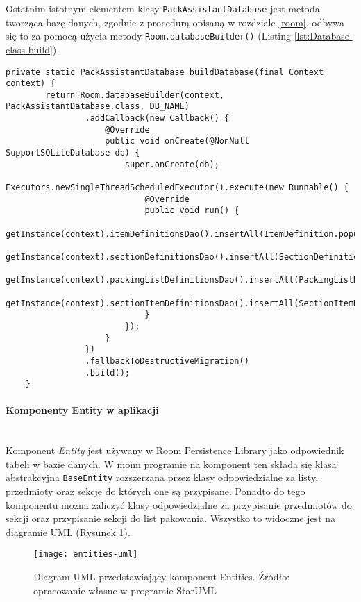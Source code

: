 \documentclass[a4paper,12pt]{article}
\newcommand{\imagewidth}{1.0}
\begin{document}
Ostatnim istotnym elementem klasy \texttt{PackAssistantDatabase} jest metoda tworząca bazę danych, zgodnie z procedurą opisaną w rozdziale \ref{room}, odbywa się to za pomocą użycia metody \texttt{Room.databaseBuilder()} (Listing \ref{lst:Database-class-build}).
\begin{lstlisting}[caption= Metoda \textit{buildDatabase} w klasie PackAssistantDatabase,label={lst:Database-class-build}]
private static PackAssistantDatabase buildDatabase(final Context context) {
        return Room.databaseBuilder(context, PackAssistantDatabase.class, DB_NAME)
                .addCallback(new Callback() {
                    @Override
                    public void onCreate(@NonNull SupportSQLiteDatabase db) {
                        super.onCreate(db);
                        Executors.newSingleThreadScheduledExecutor().execute(new Runnable() {
                            @Override
                            public void run() {
                                getInstance(context).itemDefinitionsDao().insertAll(ItemDefinition.populateData());
                                getInstance(context).sectionDefinitionsDao().insertAll(SectionDefinition.populateData());
                                getInstance(context).packingListDefinitionsDao().insertAll(PackingListDefinition.populateData());
                                getInstance(context).sectionItemDefinitionsDao().insertAll(SectionItemDefinition.populateData());
                            }
                        });
                    }
                })
                .fallbackToDestructiveMigration()
                .build();
    }
\end{lstlisting}

\paragraph{Komponenty Entity w aplikacji} ~\\

Komponent \textit{Entity} jest używany w Room Persistence Library jako odpowiednik tabeli w bazie danych. W moim programie na komponent ten składa się klasa abstrakcyjna \texttt{BaseEntity} rozszerzana przez klasy odpowiedzialne za listy, przedmioty oraz sekcje do których one są przypisane. Ponadto do tego komponentu można zaliczyć klasy odpowiedzialne za przypisanie przedmiotów do sekcji oraz przypisanie sekcji do list pakowania. Wszystko to widoczne jest na diagramie UML (Rysunek \ref{fig:entities-uml}).

\begin{figure}[H]
    \centering
    \texttt{[image: entities-uml]}
    \caption{Diagram UML przedstawiający komponent Entities. Źródło: opracowanie własne w programie StarUML \cite{staruml}}
    \label{fig:entities-uml}
\end{figure}
\end{document}

